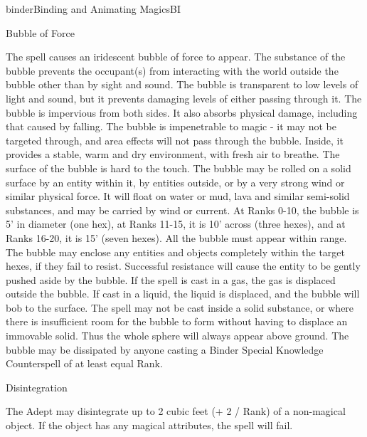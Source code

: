\begin{college}[1.1]{binder}{Binding and Animating Magics}{BI}
\begin{spell}[S-1]{Bubble of Force}
\begin{effects}
The spell causes an iridescent bubble of force to appear. The
substance of the bubble prevents the occupant(s) from interacting with
the world outside the bubble other than by sight and sound. The bubble
is transparent to low levels of light and sound, but it prevents
damaging levels of either passing through it. The bubble is impervious
from both sides. It also absorbs physical damage, including that
caused by falling. The bubble is impenetrable to magic - it may not be
targeted through, and area effects will not pass through the
bubble. Inside, it provides a stable, warm and dry environment, with
fresh air to breathe. The surface of the bubble is hard to the
touch. The bubble may be rolled on a solid surface by an entity within
it, by entities outside, or by a very strong wind or similar physical
force. It will float on water or mud, lava and similar semi-solid
substances, and may be carried by wind or current. At Ranks 0-10, the
bubble is 5' in diameter (one hex), at Ranks 11-15, it is 10' across
(three hexes), and at Ranks 16-20, it is 15' (seven hexes). All the
bubble must appear within range. The bubble may enclose any entities
and objects completely within the target hexes, if they fail to
resist. Successful resistance will cause the entity to be gently
pushed aside by the bubble. If the spell is cast in a gas, the gas is
displaced outside the bubble. If cast in a liquid, the liquid is
displaced, and the bubble will bob to the surface. The spell may not
be cast inside a solid substance, or where there is insufficient room
for the bubble to form without having to displace an immovable
solid. Thus the whole sphere will always appear above ground. The
bubble may be dissipated by anyone casting a Binder Special Knowledge
Counterspell of at least equal Rank.
\end{effects}
\end{spell}

\begin{spell}[S-2]{Disintegration}

\begin{effects}
The Adept may disintegrate up to 2 cubic feet (+ 2 / Rank) of a
non-magical object. If the object has any magical attributes, the
spell will fail.
\end{effects}
\end{spell}


\end{college}
